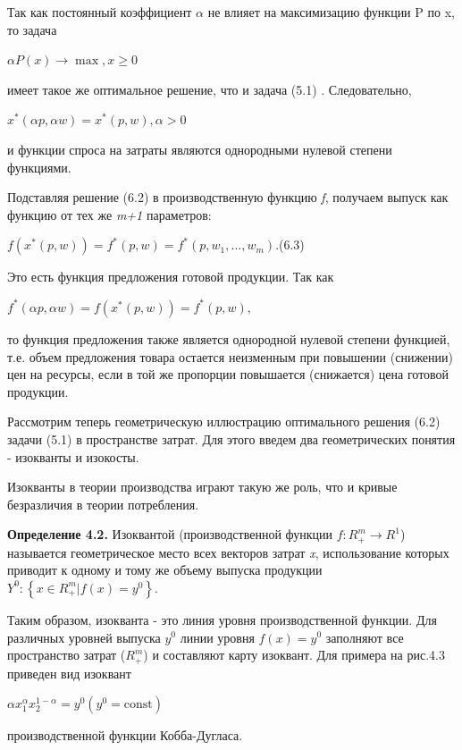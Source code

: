 \documentclass[12pt, 4paper]{book}
\begin{document}
{Так как постоянный коэффициент $\alpha$ не влияет на максимизацию функции P по x, то задача 
\begin{center}
$\alpha P(x) \rightarrow \max, x \geq 0$
\end{center}
имеет такое же оптимальное решение, что и задача (5.1) . Следовательно, 
\begin{center}
$x^{*}(\alpha p, \alpha w)=x^{*}(p,w),\alpha >0$
\end{center}
и функции спроса на затраты являются однородными нулевой степени функциями. 
\par

Подставляя решение (6.2) в производственную функцию \textit{f}, получаем выпуск как функцию от тех же \textit{m+1} параметров: 
\begin{center}
$f(x^{*}(p,w))=f^{*}(p,w)=f^{*}(p,w_1,...,w_m).$(6.3)
\end{center}
Это есть функция предложения готовой продукции. Так как 
\begin{center}
$f^{*}(\alpha p,\alpha w)=f(x^{*}(p,w))=f^{*}(p,w)$,
\end{center}
то функция предложения также является однородной нулевой степени функцией, т.е. объем предложения товара остается неизменным при повышении (снижении) цен на ресурсы, если в той же пропорции повышается (снижается) цена готовой продукции. 
\par

Рассмотрим теперь геометрическую иллюстрацию оптимального решения (6.2) задачи (5.1) в пространстве затрат. Для этого введем два геометрических понятия - изокванты и изокосты. 
\par

Изокванты в теории производства играют такую же роль, что и кривые безразличия в теории потребления. 
\par

\textbf{Определение 4.2.} Изоквантой (производственной функции $f:R_{+}^{m} \rightarrow R^{1}$) называется геометрическое место всех векторов затрат \textit{x}, использование которых приводит к одному и тому же объему выпуска продукции $Y^{0}:\left\{x \in R_{+}^{m}|f(x)=y^{0}\right\}$.
\par

Таким образом, изокванта - это линия уровня производственной функции. Для различных уровней выпуска $y^{0}$ линии уровня $f(x)=y^0$ заполняют все пространство затрат ($R_{+}^{m}$) и составляют карту изоквант. Для примера на рис.4.3 приведен вид изоквант 
\begin{center}
$\alpha x_{1}^{\alpha} x_{2}^{1-\alpha}=y^0 (y^0 = \text{const})$
\end{center}
производственной функции Кобба-Дугласа. 
\par

}
\end{document}
